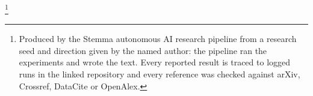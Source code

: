 \thanks{Produced by the Stemma autonomous AI research pipeline from a research seed and direction given by the named author: the pipeline ran the experiments and wrote the text. Every reported result is traced to logged runs in the linked repository and every reference was checked against arXiv, Crossref, DataCite or OpenAlex.}
